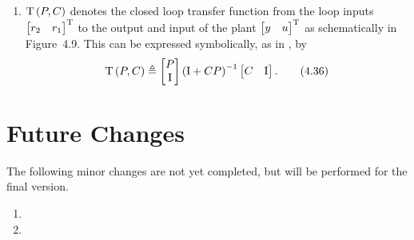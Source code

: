 \documentclass{responseletter}
\begin{document}
\begin{enumerate}
  \item 
  \begin{newquote}
  $\mathrm{T}\left(P,C\right)$ denotes the closed loop transfer function from the loop inputs $ \begin{bmatrix} r_2 & r_1 \end{bmatrix} ^{\mathrm{T}}$ to the output and input of the plant $ \begin{bmatrix} y & u \end{bmatrix} ^{\mathrm{T}}$ as schematically in Figure~4.9.
This can be expressed symbolically, as in \citet{Oomen2012SIRP}, by
\begin{equation}
\mathrm{T}\left(P, C\right) \triangleq
\begin{bmatrix}
  P\\
  \mathrm{I}
\end{bmatrix}
\left(\mathrm{I} + C P \right)^{-1}
\begin{bmatrix}
C & \mathrm{I}
\end{bmatrix}
\label{eq:lrmhinf:closedLoop}
\text{.}
\tag{4.36}
\end{equation}
  \end{newquote}
\end{enumerate}

\section{Future Changes}
The following minor changes are not yet completed, but will be performed for the final version.

\begin{enumerate}
  \item {}
\item {}
\end{enumerate}

\newpage
\printbibliography[heading=bibintoc]
\end{document}
